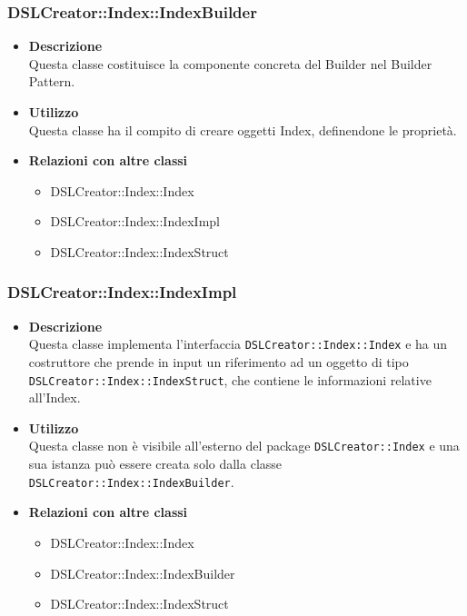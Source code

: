  \subsubsection{DSLCreator::Index::IndexBuilder}
                    \begin{itemize}
                        \item \textbf{Descrizione} \hfill \\
                            Questa classe costituisce la componente concreta del Builder nel Builder Pattern.
                        \item \textbf{Utilizzo} \hfill \\
                            Questa classe ha il compito di creare oggetti Index, definendone le proprietà.
                        \item \textbf{Relazioni con altre classi}
                            \begin{itemize}
                              \item DSLCreator::Index::Index
                              \item DSLCreator::Index::IndexImpl
                              \item DSLCreator::Index::IndexStruct
                            \end{itemize}
                    \end{itemize}
  
 \subsubsection{DSLCreator::Index::IndexImpl}
                    \begin{itemize}
                        \item \textbf{Descrizione} \hfill \\
                          Questa classe implementa l'interfaccia \texttt{DSLCreator::Index::Index} e ha un costruttore che prende in input un riferimento ad un oggetto di tipo \texttt{DSLCrea\-tor::Index::IndexStruct}, che contiene le informazioni relative all'Index.
                        \item \textbf{Utilizzo} \hfill \\
                          Questa classe non è visibile all'esterno del package \texttt{DSLCreator::Index} e una sua istanza può essere creata solo dalla classe \texttt{DSLCreator::Index::IndexBuilder}.
                        \item \textbf{Relazioni con altre classi}
                            \begin{itemize}
                              \item DSLCreator::Index::Index
                              \item DSLCreator::Index::IndexBuilder
                              \item DSLCreator::Index::IndexStruct
                            \end{itemize}
                    \end{itemize}

